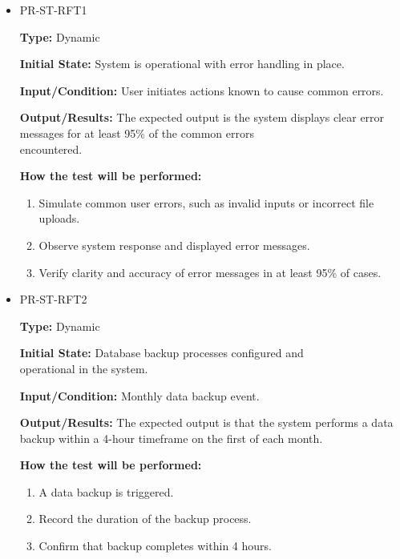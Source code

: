 \documentclass[12pt, titlepage]{article}
\begin{document}
\begin{itemize}
  \item PR-ST-RFT1
  \begin{mdframed}[linewidth=0.5mm]
      \textbf{Type:} Dynamic \par
      \textbf{Initial State:} System is operational with error handling in place. \par
      \textbf{Input/Condition:} User initiates actions known to cause common errors. \par
      \textbf{Output/Results:} The expected output is the system displays clear error messages for at least 95\% of the common errors \\encountered. \par
      \textbf{How the test will be performed:}
      \begin{enumerate}[noitemsep]
        \item Simulate common user errors, such as invalid inputs or incorrect file uploads.
        \item Observe system response and displayed error messages.
        \item Verify clarity and accuracy of error messages in at least 95\% of cases.
      \end{enumerate}
  \end{mdframed}
  \item PR-ST-RFT2
  \begin{mdframed}[linewidth=0.5mm]
      \textbf{Type:} Dynamic \par
      \textbf{Initial State:} Database backup processes configured and \\operational in the system. \par
      \textbf{Input/Condition:} Monthly data backup event. \par
      \textbf{Output/Results:} The expected output is that the system performs a data backup within a 4-hour timeframe on the first of each month. \par
      \textbf{How the test will be performed:}
      \begin{enumerate}[noitemsep]
        \item A data backup is triggered.
        \item Record the duration of the backup process.
        \item Confirm that backup completes within 4 hours.
      \end{enumerate}
  \end{mdframed}
\end{itemize}
\end{document}
